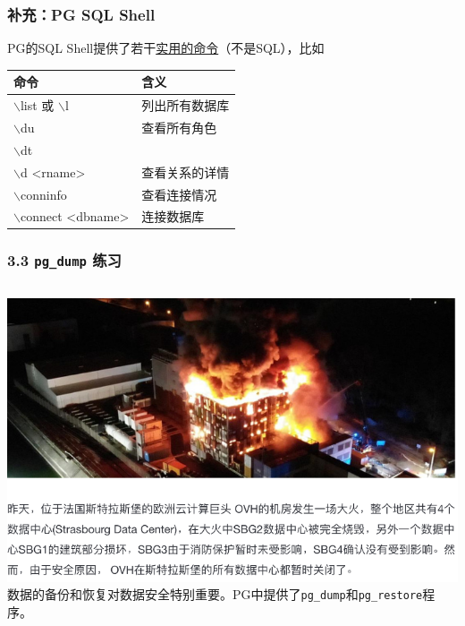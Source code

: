 \documentclass[aspectratio=169, 14pt]{beamer}
\begin{document}
\begin{frame}
    \frametitle{补充：PG SQL Shell}
PG的SQL Shell提供了若干\href{https://www.postgresql.org/docs/current/app-psql.html}{实用的命令}（不是SQL），比如

\begin{table}
    \begin{tabular}{ll}
      \toprule
      命令 & 含义 \\
      \midrule
      $\backslash$list 或 $\backslash$l & 列出所有数据库 \\
      $\backslash$du & 查看所有角色 \\
      $\backslash$dt & \\
      $\backslash$d <rname> & 查看关系的详情 \\
      $\backslash$conninfo & 查看连接情况 \\ 
      $\backslash$connect <dbname> & 连接数据库 \\
      \bottomrule
    \end{tabular}
\end{table}

\end{frame}

\begin{frame}
    \frametitle{3.3 \texttt{pg\_dump} 练习}

\begin{columns}
    \includegraphics[width=\textwidth]{advanced/fire}
    数据的备份和恢复对数据安全特别重要。PG中提供了\texttt{pg\_dump}和\texttt{pg\_restore}程序。
\end{columns}

\end{frame}
\end{document}
